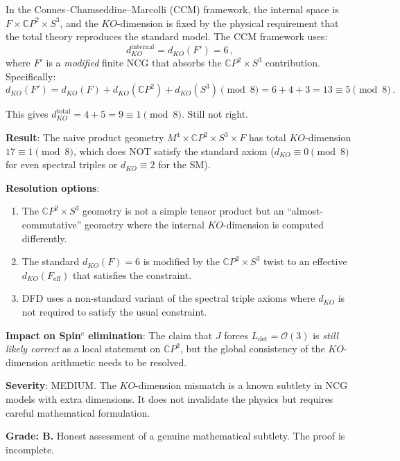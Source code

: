 \documentclass[11pt,a4paper]{article}
\newcommand{\CP}{\mathbb{C}P}
\begin{document}
In the Connes--Chamseddine--Marcolli (CCM) framework, the internal space is $F \times \CP^2 \times S^3$, and the $KO$-dimension is fixed by the physical requirement that the total theory reproduces the standard model. The CCM framework uses:
\begin{equation}
d_{KO}^{\mathrm{internal}} = d_{KO}(F') = 6\,,
\end{equation}
where $F'$ is a \emph{modified} finite NCG that absorbs the $\CP^2 \times S^3$ contribution. Specifically:
\begin{equation}
d_{KO}(F') = d_{KO}(F) + d_{KO}(\CP^2) + d_{KO}(S^3) \pmod{8} = 6 + 4 + 3 = 13 \equiv 5 \pmod{8}\,.
\end{equation}

This gives $d_{KO}^{\mathrm{total}} = 4 + 5 = 9 \equiv 1 \pmod{8}$. Still not right.

\begin{tcolorbox}[colback=red!5!white, colframe=red!60!black, title={Agent 10: $KO$-Dimension Issue}]
\textbf{Result}: The naive product geometry $M^4 \times \CP^2 \times S^3 \times F$ has total $KO$-dimension $17 \equiv 1 \pmod{8}$, which does NOT satisfy the standard axiom ($d_{KO} \equiv 0 \pmod{8}$ for even spectral triples or $d_{KO} \equiv 2$ for the SM).

\textbf{Resolution options}:
\begin{enumerate}
\item The $\CP^2 \times S^3$ geometry is not a simple tensor product but an ``almost-commutative'' geometry where the internal $KO$-dimension is computed differently.
\item The standard $d_{KO}(F) = 6$ is modified by the $\CP^2 \times S^3$ twist to an effective $d_{KO}(F_{\mathrm{eff}})$ that satisfies the constraint.
\item DFD uses a non-standard variant of the spectral triple axioms where $d_{KO}$ is not required to satisfy the usual constraint.
\end{enumerate}

\textbf{Impact on Spin$^c$ elimination}: The claim that $J$ forces $L_{\det} = \mathcal{O}(3)$ is \emph{still likely correct} as a local statement on $\CP^2$, but the global consistency of the $KO$-dimension arithmetic needs to be resolved.

\textbf{Severity}: MEDIUM. The $KO$-dimension mismatch is a known subtlety in NCG models with extra dimensions. It does not invalidate the physics but requires careful mathematical formulation.

\textbf{Grade: B.} Honest assessment of a genuine mathematical subtlety. The proof is incomplete.
\end{tcolorbox}
\end{document}

